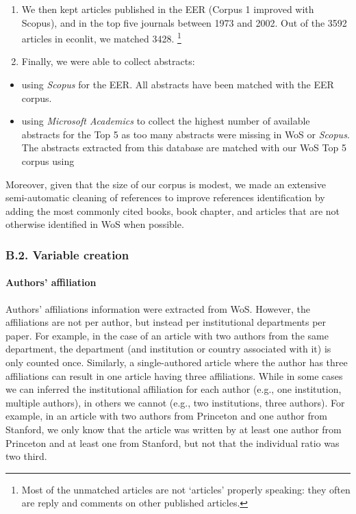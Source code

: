 \documentclass[
  12pt,
  onecolumn]{article}
\providecommand{\tightlist}{%
  \setlength{\itemsep}{0pt}\setlength{\parskip}{0pt}}
\begin{document}
\begin{enumerate}
\def\labelenumi{\arabic{enumi}.}
\setcounter{enumi}{2}
\item
  We then kept articles published in the EER (Corpus 1 improved with
  Scopus), and in the top five journals between 1973 and 2002. Out of
  the 3592 articles in econlit, we matched 3428. \footnote{Most of the
    unmatched articles are not `articles' properly speaking: they often
    are reply and comments on other published articles.}
\item
  Finally, we were able to collect abstracts:
\end{enumerate}

\begin{itemize}
\tightlist
\item
  using \emph{Scopus} for the EER. All abstracts have been matched with
  the EER corpus.
\item
  using \emph{Microsoft Academics} to collect the highest number of
  available abstracts for the Top 5 as too many abstracts were missing
  in WoS or \emph{Scopus}. The abstracts extracted from this database
  are matched with our WoS Top 5 corpus using
\end{itemize}

Moreover, given that the size of our corpus is modest, we made an
extensive semi-automatic cleaning of references to improve references
identification by adding the most commonly cited books, book chapter,
and articles that are not otherwise identified in WoS when possible.

\hypertarget{b.2.-variable-creation}{%
\subsubsection*{B.2. Variable creation}\label{b.2.-variable-creation}}

\hypertarget{author-affiliation}{%
\paragraph*{Authors' affiliation}\label{author-affiliation}}

Authors' affiliations information were extracted from WoS. However, the
affiliations are not per author, but instead per institutional
departments per paper. For example, in the case of an article with two
authors from the same department, the department (and institution or
country associated with it) is only counted once. Similarly, a
single-authored article where the author has three affiliations can
result in one article having three affiliations. While in some cases we
can inferred the institutional affiliation for each author (e.g., one
institution, multiple authors), in others we cannot (e.g., two
institutions, three authors). For example, in an article with two
authors from Princeton and one author from Stanford, we only know that
the article was written by at least one author from Princeton and at
least one from Stanford, but not that the individual ratio was two
third.
\end{document}
